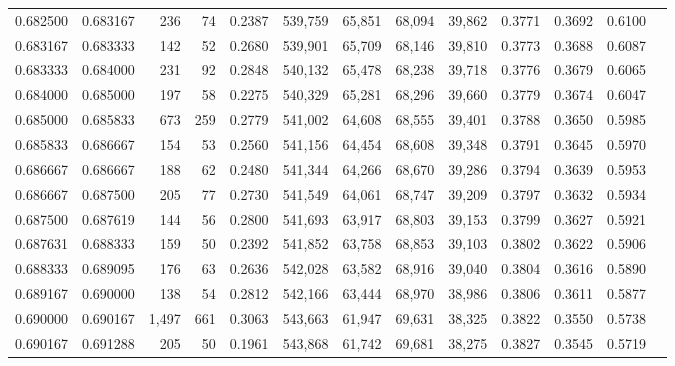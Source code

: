\begin{tabular}{rrrrrrrrrrrrr}
0.682500 & 0.683167 &   236 &  74 &                                     0.2387 & 539,759 &  65,851 &  68,094 &  39,862 & 0.3771 & 0.3692 & 0.6100 \\
0.683167 & 0.683333 &   142 &  52 &                                     0.2680 & 539,901 &  65,709 &  68,146 &  39,810 & 0.3773 & 0.3688 & 0.6087 \\
0.683333 & 0.684000 &   231 &  92 &                                     0.2848 & 540,132 &  65,478 &  68,238 &  39,718 & 0.3776 & 0.3679 & 0.6065 \\
0.684000 & 0.685000 &   197 &  58 &                                     0.2275 & 540,329 &  65,281 &  68,296 &  39,660 & 0.3779 & 0.3674 & 0.6047 \\
0.685000 & 0.685833 &   673 & 259 &                                     0.2779 & 541,002 &  64,608 &  68,555 &  39,401 & 0.3788 & 0.3650 & 0.5985 \\
0.685833 & 0.686667 &   154 &  53 &                                     0.2560 & 541,156 &  64,454 &  68,608 &  39,348 & 0.3791 & 0.3645 & 0.5970 \\
0.686667 & 0.686667 &   188 &  62 &                                     0.2480 & 541,344 &  64,266 &  68,670 &  39,286 & 0.3794 & 0.3639 & 0.5953 \\
0.686667 & 0.687500 &   205 &  77 &                                     0.2730 & 541,549 &  64,061 &  68,747 &  39,209 & 0.3797 & 0.3632 & 0.5934 \\
0.687500 & 0.687619 &   144 &  56 &                                     0.2800 & 541,693 &  63,917 &  68,803 &  39,153 & 0.3799 & 0.3627 & 0.5921 \\
0.687631 & 0.688333 &   159 &  50 &                                     0.2392 & 541,852 &  63,758 &  68,853 &  39,103 & 0.3802 & 0.3622 & 0.5906 \\
0.688333 & 0.689095 &   176 &  63 &                                     0.2636 & 542,028 &  63,582 &  68,916 &  39,040 & 0.3804 & 0.3616 & 0.5890 \\
0.689167 & 0.690000 &   138 &  54 &                                     0.2812 & 542,166 &  63,444 &  68,970 &  38,986 & 0.3806 & 0.3611 & 0.5877 \\
0.690000 & 0.690167 & 1,497 & 661 &                                     0.3063 & 543,663 &  61,947 &  69,631 &  38,325 & 0.3822 & 0.3550 & 0.5738 \\
0.690167 & 0.691288 &   205 &  50 &                                     0.1961 & 543,868 &  61,742 &  69,681 &  38,275 & 0.3827 & 0.3545 & 0.5719 \\

\end{tabular}
